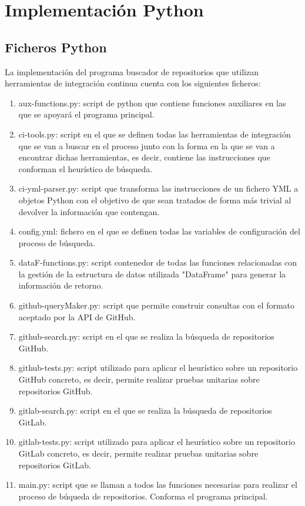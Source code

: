 \section{Implementación Python}

\subsection{Ficheros Python}
La implementación del programa buscador de repositorios que utilizan herramientas de integración continua cuenta con los siguientes ficheros:
\begin{enumerate}
    \item aux-functions.py: script de python que contiene funciones auxiliares en las que se apoyará el programa principal.
    \item ci-tools.py: script en el que se definen todas las herramientas de integración que se van a buscar en el proceso junto con la forma en la que se van a encontrar dichas herramientas, es decir, contiene las instrucciones que conforman el heurístico de búsqueda.
    \item ci-yml-parser.py: script que transforma las instrucciones de un fichero YML a objetos Python con el objetivo de que sean tratados  de forma más trivial al devolver la información que contengan.
    \item config.yml: fichero en el que se definen todas las variables de configuración del proceso de búsqueda.
    \item dataF-functions.py: script contenedor de todas las funciones relacionadas con la gestión de la estructura de datos utilizada "DataFrame" para generar la información de retorno.
    \item github-queryMaker.py: script que permite construir consultas con el formato aceptado por la API de GitHub.
    \item github-search.py: script en el que se realiza la búsqueda de repositorios GitHub.
    \item github-tests.py: script utilizado para aplicar el heurístico sobre un repositorio GitHub concreto, es decir, permite realizar pruebas unitarias sobre repositorios GitHub.
    \item gitlab-search.py: script en el que se realiza la búsqueda de repositorios GitLab.
    \item gitlab-tests.py: script utilizado para aplicar el heurístico sobre un repositorio GitLab concreto, es decir, permite realizar pruebas unitarias sobre repositorios GitLab.
    \item main.py: script que se llaman a todos las funciones necesarias para realizar el proceso de búqueda de repositorios. Conforma el programa principal.
\end{enumerate}

